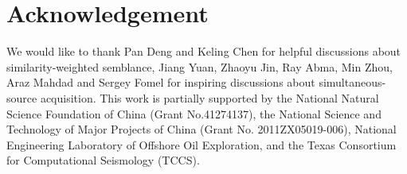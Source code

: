 \section{Acknowledgement}
We would like to thank Pan Deng and Keling Chen for helpful discussions about similarity-weighted semblance, Jiang Yuan, Zhaoyu Jin, Ray Abma, Min Zhou, Araz Mahdad and Sergey Fomel for inspiring discussions about simultaneous-source acquisition.  This work is partially supported by the National Natural Science Foundation of China (Grant No.41274137), the National Science and Technology of Major Projects of China (Grant No. 2011ZX05019-006), National Engineering Laboratory of Offshore Oil Exploration, and the Texas Consortium for Computational Seismology (TCCS). 















